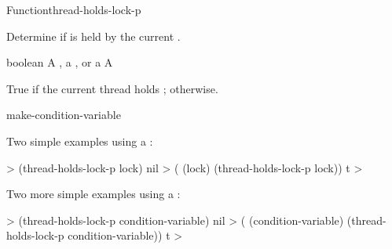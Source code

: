 \begin{functiondoc}{Function}{thread-holds-lock-p}{
    \returns{} }
%

\fnsyntax

\fnpurpose Determine if  is held by the current .

\fnpackage {}

\fnmodule {}

\fnargs
\begin{args}{boolean}
\arg[lock] A , a , or a 
\arg[boolean] A 
\end{args}

\fnreturns True if the current thread holds ; \nil{} otherwise.

\begin{alsos}{make-condition-variable}
\end{alsos}

%
\fnexamples
Two simple examples using a :
%
\W\supp
\begin{example}
  > (thread-holds-lock-p lock)
  nil
  > ( (lock)
      (thread-holds-lock-p lock))
  t
  >
\end{example}
%
Two more simple examples using a :
%
\W\supp\notpretop
\begin{example}
  > (thread-holds-lock-p condition-variable)
  nil
  > ( (condition-variable)
      (thread-holds-lock-p condition-variable))
  t
  >
\end{example}

\end{functiondoc}


